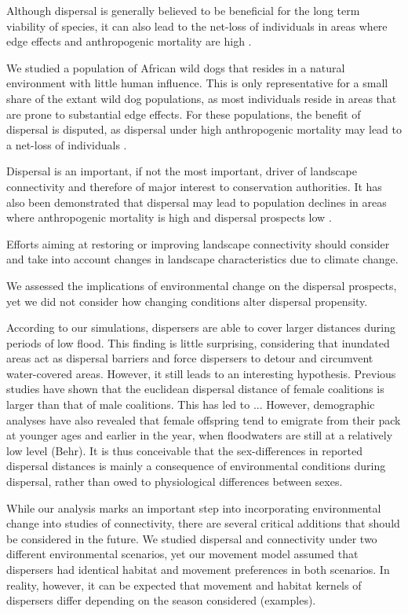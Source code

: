 \documentclass[abstract=on,10pt,a4paper,bibliography=totocnumbered]{article}
\begin{document}
Although dispersal is generally believed to be beneficial for the long term viability of species, it can also lead to the net-loss of individuals in areas where edge effects and anthropogenic mortality are high \citep{Leigh.2012}.

We studied a population of African wild dogs that resides in a natural
environment with little human influence. This is only representative for a small
share of the extant wild dog populations, as most individuals reside in areas
that are prone to substantial edge effects. For these populations, the benefit
of dispersal is disputed, as dispersal under high anthropogenic mortality may
lead to a net-loss of individuals \citep{Leigh.2012}.

Dispersal is an important, if not the most important, driver of landscape
connectivity and therefore of major interest to conservation authorities. It has
also been demonstrated that dispersal may lead to population declines in areas
where anthropogenic mortality is high and dispersal prospects low
\citep{Leigh.2012}.


Efforts aiming at restoring or improving landscape connectivity should consider
and take into account changes in landscape characteristics due to climate
change.

We assessed the implications of environmental change on the dispersal prospects,
yet we did not consider how changing conditions alter dispersal propensity.

According to our simulations, dispersers are able to cover larger distances
during periods of low flood. This finding is little surprising, considering that
inundated areas act as dispersal barriers and force dispersers to detour and
circumvent water-covered areas. However, it still leads to an interesting
hypothesis. Previous studies have shown that the euclidean dispersal distance of
female coalitions is larger than that of male coalitions. This has led to ...
However, demographic analyses have also revealed that female offspring tend to
emigrate from their pack at younger ages and earlier in the year, when
floodwaters are still at a relatively low level (Behr). It is thus conceivable
that the sex-differences in reported dispersal distances is mainly a consequence
of environmental conditions during dispersal, rather than owed to physiological
differences between sexes.

While our analysis marks an important step into incorporating environmental
change into studies of connectivity, there are several critical additions that
should be considered in the future. We studied dispersal and connectivity under
two different environmental scenarios, yet our movement model assumed that
dispersers had identical habitat and movement preferences in both scenarios. In
reality, however, it can be expected that movement and habitat kernels of
dispersers differ depending on the season considered (examples).
\end{document}
